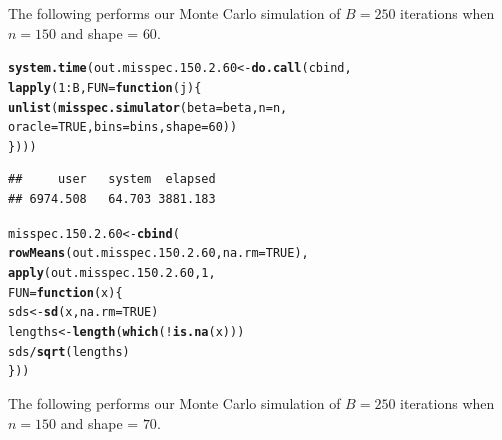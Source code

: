 \documentclass[11pt]{article}\usepackage[]{graphicx}\usepackage[]{color}
\makeatletter
\newcommand{\hlnum}[1]{\textcolor[rgb]{0.686,0.059,0.569}{#1}}%
\newcommand{\hlopt}[1]{\textcolor[rgb]{0,0,0}{#1}}%
\newcommand{\hlstd}[1]{\textcolor[rgb]{0.345,0.345,0.345}{#1}}%
\newcommand{\hlkwa}[1]{\textcolor[rgb]{0.161,0.373,0.58}{\textbf{#1}}}%
\newcommand{\hlkwb}[1]{\textcolor[rgb]{0.69,0.353,0.396}{#1}}%
\newcommand{\hlkwc}[1]{\textcolor[rgb]{0.333,0.667,0.333}{#1}}%
\newcommand{\hlkwd}[1]{\textcolor[rgb]{0.737,0.353,0.396}{\textbf{#1}}}%
\newenvironment{kframe}{%
 \def\at@end@of@kframe{}%
 \ifinner\ifhmode%
  \def\at@end@of@kframe{\end{minipage}}%
  \begin{minipage}{\columnwidth}%
 \fi\fi%
 \def\FrameCommand##1{\hskip\@totalleftmargin \hskip-\fboxsep
 \colorbox{shadecolor}{##1}\hskip-\fboxsep
     \hskip-\linewidth \hskip-\@totalleftmargin \hskip\columnwidth}%
 \MakeFramed {\advance\hsize-\width
   \@totalleftmargin\z@ \linewidth\hsize
   \@setminipage}}%
 {\par\unskip\endMakeFramed%
 \at@end@of@kframe}
\newenvironment{knitrout}{}{} %
\makeatother
\begin{document}
The following performs our Monte Carlo simulation of $B = 250$ iterations 
when $n = 150$ and shape = $60$.

\begin{knitrout}
\color{fgcolor}\begin{kframe}
\begin{alltt}
\hlkwd{system.time}\hlstd{(out.misspec.150.2.60} \hlkwb{<-} \hlkwd{do.call}\hlstd{(cbind,}
  \hlkwd{lapply}\hlstd{(}\hlnum{1}\hlopt{:}\hlstd{B,} \hlkwc{FUN} \hlstd{=} \hlkwa{function}\hlstd{(}\hlkwc{j}\hlstd{)\{}
    \hlkwd{unlist}\hlstd{(}\hlkwd{misspec.simulator}\hlstd{(}\hlkwc{beta} \hlstd{= beta,} \hlkwc{n} \hlstd{= n,}
      \hlkwc{oracle} \hlstd{=} \hlnum{TRUE}\hlstd{,} \hlkwc{bins} \hlstd{= bins,} \hlkwc{shape} \hlstd{=} \hlnum{60}\hlstd{))}
\hlstd{\})))}
\end{alltt}
\begin{verbatim}
##     user   system  elapsed 
## 6974.508   64.703 3881.183
\end{verbatim}
\end{kframe}
\end{knitrout}

\begin{knitrout}
\color{fgcolor}\begin{kframe}
\begin{alltt}
\hlstd{misspec.150.2.60} \hlkwb{<-} \hlkwd{cbind}\hlstd{(}
  \hlkwd{rowMeans}\hlstd{(out.misspec.150.2.60,} \hlkwc{na.rm} \hlstd{=} \hlnum{TRUE}\hlstd{),}
  \hlkwd{apply}\hlstd{(out.misspec.150.2.60,} \hlnum{1}\hlstd{,}
  \hlkwc{FUN} \hlstd{=} \hlkwa{function}\hlstd{(}\hlkwc{x}\hlstd{)\{}
    \hlstd{sds} \hlkwb{<-} \hlkwd{sd}\hlstd{(x,} \hlkwc{na.rm} \hlstd{=} \hlnum{TRUE}\hlstd{)}
    \hlstd{lengths} \hlkwb{<-} \hlkwd{length}\hlstd{(}\hlkwd{which}\hlstd{(}\hlopt{!}\hlkwd{is.na}\hlstd{(x)))}
    \hlstd{sds} \hlopt{/} \hlkwd{sqrt}\hlstd{(lengths)}
  \hlstd{\}))}
\end{alltt}
\end{kframe}
\end{knitrout}

The following performs our Monte Carlo simulation of $B = 250$ iterations 
when $n = 150$ and shape = $70$.
\end{document}
